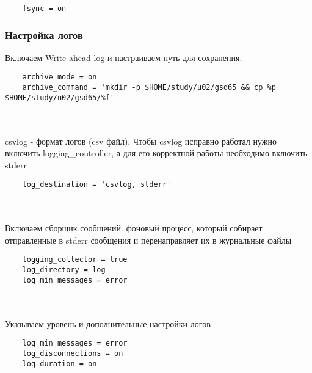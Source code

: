 \documentclass{article}
\begin{document}
\begin{verbatim}
    fsync = on
\end{verbatim}

\subsubsection{Настройка логов}
Включаем Write ahead log и настраиваем путь для сохранения.
\begin{verbatim}
    archive_mode = on
    archive_command = 'mkdir -p $HOME/study/u02/gsd65 && cp %p $HOME/study/u02/gsd65/%f'
\end{verbatim}
\\ \\ 
csvlog - формат логов (csv файл). Чтобы csvlog исправно работал нужно включить logging\_controller, а для его корректной работы необходимо включить stderr
\begin{verbatim}
    log_destination = 'csvlog, stderr'
\end{verbatim}
\\ \\ 
Включаем сборщик сообщений. фоновый процесс, который собирает отправленные в stderr сообщения и перенаправляет их в журнальные файлы
\begin{verbatim}
    logging_collector = true
    log_directory = log
    log_min_messages = error
\end{verbatim}
\\ \\
Указываем уровень и дополнительные настройки логов
\begin{verbatim}
    log_min_messages = error
    log_disconnections = on
    log_duration = on
\end{verbatim}
\end{document}
